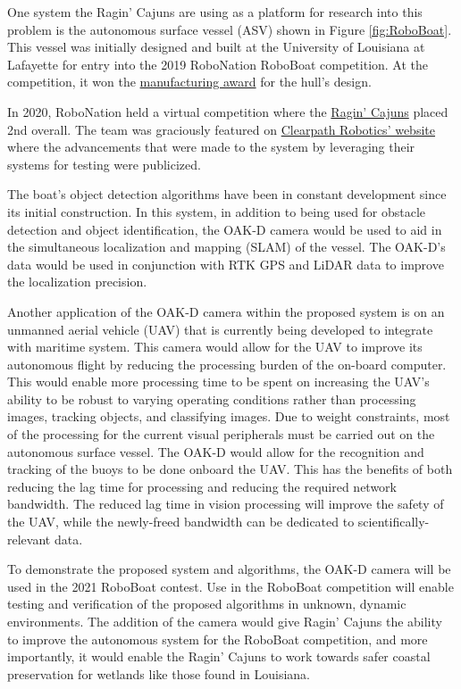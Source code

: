 \documentclass[12 pt]{article}
\begin{document}
%
One system the Ragin' Cajuns are using as a platform for research into this problem is the autonomous surface vessel (ASV) shown in Figure \ref{fig:RoboBoat}. This vessel was initially designed and built at the University of Louisiana at Lafayette for entry into the 2019 RoboNation RoboBoat competition. At the competition, it won the \href{https://mechanical.louisiana.edu/news-events/news/20190627/university-team-earns-manufacturing-award-international-roboboat}{manufacturing award} for the hull's design. 

In 2020, RoboNation held a virtual competition where the \href{https://crawlab.github.io/RoboBoat-2020/} {Ragin' Cajuns} placed 2nd overall. The team was graciously featured on \href{https://clearpathrobotics.com/blog/2020/11/research-team-uses-clearpath-simulation-in-second-place-finish-at-roboboat-2020/}{Clearpath Robotics' website} where the advancements that were made to the system by leveraging their systems for testing were publicized. 

The boat's object detection algorithms have been in constant development since its initial construction. In this system, in addition to being used for obstacle detection and object identification, the OAK-D camera would be used to aid in the simultaneous localization and mapping (SLAM) of the vessel. The OAK-D's data would be used in conjunction with RTK GPS and LiDAR data to improve the localization precision. 

Another application of the OAK-D camera within the proposed system is on an unmanned aerial vehicle (UAV) that is currently being developed to integrate with maritime system. This camera would allow for the UAV to improve its autonomous flight by reducing the processing burden of the on-board computer. This would enable more processing time to be spent on increasing the UAV's ability to be robust to varying operating conditions rather than processing images, tracking objects, and classifying images. Due to weight constraints, most of the processing for the current visual peripherals must be carried out on the autonomous surface vessel. The OAK-D would allow for the recognition and tracking of the buoys to be done onboard the UAV. This has the benefits of both reducing the lag time for processing and reducing the required network bandwidth. The reduced lag time in vision processing will improve the safety of the UAV, while the newly-freed bandwidth can be dedicated to scientifically-relevant data.

To demonstrate the proposed system and algorithms, the OAK-D camera will be used in the 2021 RoboBoat contest. Use in the RoboBoat competition will enable testing and verification of the proposed algorithms in unknown, dynamic environments. The addition of the camera would give Ragin' Cajuns the ability to improve the autonomous system for the RoboBoat competition, and more importantly, it would enable the Ragin' Cajuns to work towards safer coastal preservation for wetlands like those found in Louisiana.
\end{document}
